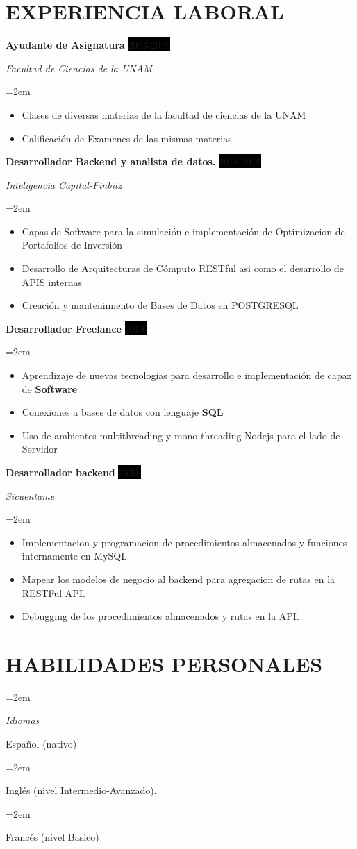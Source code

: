 \documentclass[paper=a4,fontsize=11pt]{scrartcl} %
\newlength{\spacebox}
\newcommand{\sepspace}{\vspace*{1em}}		%
\newcommand{\NewPart}[1]{\section*{\uppercase{#1}}}
\newcommand{\PersonalEntry}[2]{
		\noindent\hangindent=2em\hangafter=0 %
		\parbox{\spacebox}{        %
		\textit{#1}}		       %
		\hspace{1.5em} #2 \par}    %
\newcommand{\SkillsEntry}[2]{      %
		\noindent\hangindent=2em\hangafter=0 %
		\parbox{\spacebox}{        %
		\textit{#1}}			   %
		\hspace{1.5em} #2 \par}    %
\newcommand{\EducationEntry}[4]{
		\noindent \textbf{#1} \hfill      %
		\colorbox{White}{%
			\parbox{5cm}{%
			\hfill\color{Black}#2}} \par  %
		\noindent \textit{#3} \par        %
		\noindent\hangindent=2em\hangafter=0 \small #4 %
		\normalsize \par}
\newcommand{\WorkEntry}[4]{				  %
		\noindent \textbf{#1} \hfill      %
		\noindent\colorbox{Black}{\color{White}#2} \par  %
		\noindent \textit{#3} \par              %
		\noindent\hangindent=2em\hangafter=0 \small #4 %
		\normalsize \par}
\begin{document}
\NewPart{Experiencia laboral}{}
\WorkEntry{Ayudante de Asignatura}{2014-2019}{Facultad de Ciencias de la UNAM}{
\begin{itemize}
	\item Clases de diversas materias de la facultad de ciencias de la UNAM
	\item Calificación de Examenes de las mismas materias
\end{itemize}
}
\WorkEntry{Desarrollador Backend y analista de datos.}{2018-2019}{Inteligencia Capital-Finbitz}{
\begin{itemize}
\item{Capas de Software para la simulación e implementación de Optimizacion de Portafolios de Inversión}
\item{Desarrollo de Arquitecturas de Cómputo RESTful asi como el desarrollo de APIS internas}
\item{Creación y mantenimiento de Bases de Datos en POSTGRESQL}
\end{itemize}
}
\WorkEntry{Desarrollador Freelance}{2019-}{}{
\begin{itemize}
	\item{Aprendizaje de nuevas tecnologias para desarrollo e implementación de capaz de \textbf{Software}}
	\item{Conexiones a bases de datos con lenguaje \textbf{SQL}}
	\item {Uso de ambientes multithreading y mono threading Nodejs para el lado de Servidor}
\end{itemize}
}
\WorkEntry{Desarrollador backend}{2020-}{Sicuentame}{
\begin{itemize}
	\item{Implementacion y programacion de procedimientos almacenados y funciones internamente en MySQL}
	\item {Mapear los modelos de negocio al backend para agregacion de rutas en la RESTFul API.}
	\item {Debugging de los procedimientos almacenados y rutas en la API.}
\end{itemize}
}
\sepspace


\NewPart{Habilidades personales}{}

\SkillsEntry{Idiomas}{Español (nativo)}
\SkillsEntry{}{Inglés (nivel Intermedio-Avanzado).}
\SkillsEntry{}{Francés (nivel Basico)}
\end{document}
